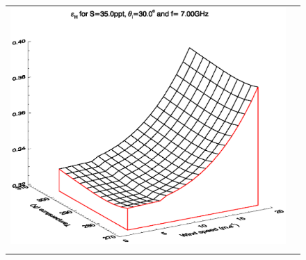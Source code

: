 \begin{figure}[htp]
\begin{tabular}{c c}
    \includegraphics[bb=110 240 508 540,clip,scale=0.5]{graphics/Model/eh_s35.0ppt_z30.0_7.00GHz.eps} \\\\


\end{tabular}
\end{figure}
